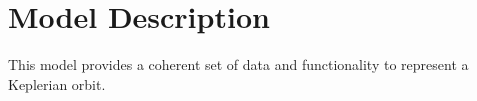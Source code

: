 \section{Model Description}
This model provides a coherent set of data and functionality to represent a Keplerian orbit.